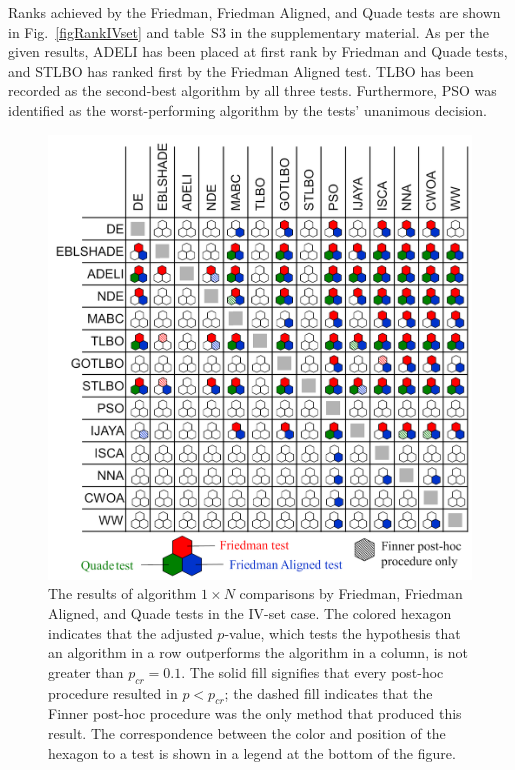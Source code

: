 \documentclass[a4paper,fleqn]{cas-sc}
\begin{document}
Ranks achieved by the Friedman, Friedman Aligned, and Quade tests are shown in Fig.~\ref{figRankIVset} and table~S3 in the supplementary material.
As per the given results, ADELI has been placed at first rank by Friedman and Quade tests,
and STLBO has ranked first by the Friedman Aligned test.
TLBO has been recorded as the second-best algorithm by all three tests.
Furthermore, PSO was identified as the worst-performing algorithm by the tests' unanimous decision.




\begin{figure}[]
	\centering
		\includegraphics[width=0.5\columnwidth]{N1Tresult}
	  \caption{The results of algorithm $1\times N$ comparisons by Friedman, Friedman Aligned, and Quade tests in the IV-set case.
               The colored hexagon indicates that the adjusted $p$-value,
               which tests the hypothesis that an algorithm in a row outperforms the algorithm in a column,
               is not greater than $p_{cr}=0.1$.
               The solid fill signifies that every post-hoc procedure resulted in $p<p_{cr}$;
               the dashed fill indicates that the Finner post-hoc procedure was the only method that produced this result.
               The correspondence between the color and position of the hexagon to a test
               is shown in a legend at the bottom of the figure.
               }\label{figN1RezIVset}
\end{figure}
\end{document}
